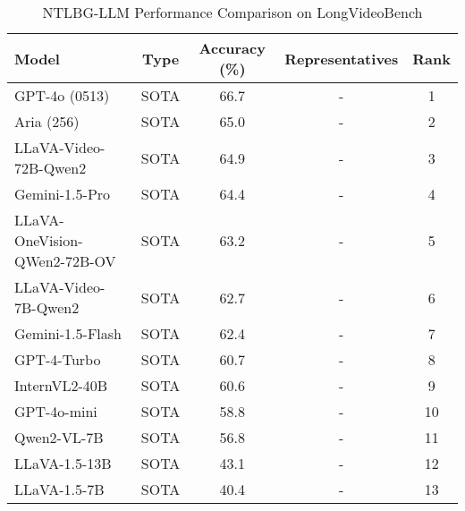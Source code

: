 \begin{table}[htbp]
\centering
\caption{NTLBG-LLM Performance Comparison on LongVideoBench}
\label{tab:ntlbg_longvideobench_comparison}
\begin{tabular}{lcccc}
\toprule
Model & Type & Accuracy (\%) & Representatives & Rank \\
\midrule
GPT-4o (0513) & SOTA & 66.7 & - & 1 \\
Aria (256) & SOTA & 65.0 & - & 2 \\
LLaVA-Video-72B-Qwen2 & SOTA & 64.9 & - & 3 \\
Gemini-1.5-Pro & SOTA & 64.4 & - & 4 \\
LLaVA-OneVision-QWen2-72B-OV & SOTA & 63.2 & - & 5 \\
LLaVA-Video-7B-Qwen2 & SOTA & 62.7 & - & 6 \\
Gemini-1.5-Flash & SOTA & 62.4 & - & 7 \\
GPT-4-Turbo & SOTA & 60.7 & - & 8 \\
InternVL2-40B & SOTA & 60.6 & - & 9 \\
GPT-4o-mini & SOTA & 58.8 & - & 10 \\
Qwen2-VL-7B & SOTA & 56.8 & - & 11 \\
LLaVA-1.5-13B & SOTA & 43.1 & - & 12 \\
LLaVA-1.5-7B & SOTA & 40.4 & - & 13 \\
\bottomrule
\end{tabular}
\end{table}
